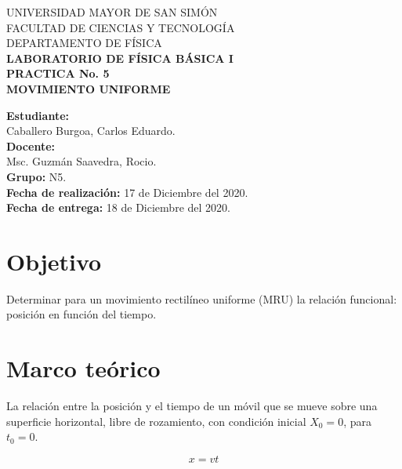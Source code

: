 \documentclass[letter,11pt]{article}
\newcommand{\blankpage}{
\newpage
\thispagestyle{empty}
\mbox{}
\newpage
}
\begin{document}
\begin{titlepage}
\begin{center}
{\Large UNIVERSIDAD MAYOR DE SAN SIMÓN}\\
\vspace*{0.15cm}
{\large FACULTAD DE CIENCIAS Y TECNOLOGÍA}\\
\vspace*{0.10cm}
DEPARTAMENTO DE FÍSICA\\
\vspace*{3.0cm}
{\Large \textbf{LABORATORIO DE FÍSICA BÁSICA I}}\\
\vspace*{0.3cm}
{\Large \textbf{PRACTICA No. 5}}\\
\vspace*{3.5cm}
{\Large \textbf{MOVIMIENTO UNIFORME}}\\
\end{center}

\vspace*{7.4cm}
\leftskip=7.95cm
\noindent
\textbf{Estudiante:}\\
Caballero Burgoa, Carlos Eduardo.\\
\newline
\textbf{Docente:}\\
Msc. Guzmán Saavedra, Rocio.\\
\newline
\textbf{Grupo:} N5.\\
\textbf{Fecha de realización:} 17 de Diciembre del 2020.\\
\textbf{Fecha de entrega:} 18 de Diciembre del 2020.\\

\end{titlepage}

\blankpage

\section{Objetivo}
Determinar para un movimiento rectilíneo uniforme (MRU) la relación funcional:
posición en función del tiempo.

\section{Marco teórico}
La relación entre la posición y el tiempo de un móvil que se mueve sobre una
superficie horizontal, libre de rozamiento, con condición inicial $X_0=0$, para
$t_0=0$.

\begin{equation*}
    x = v t
\end{equation*}
\end{document}
